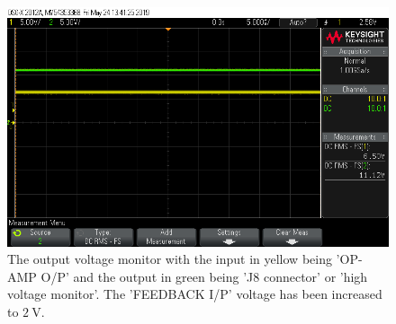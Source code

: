 \begin{figure}[H]
\centering
\includegraphics[width=.9\textwidth]{figures/scope_12.png}
\caption{The output voltage monitor with the input in yellow being 'OP-AMP O/P' and the output in green being 'J8 connector' or 'high voltage monitor'. The 'FEEDBACK I/P' voltage has been increased to $\SI{2}{\volt}$.}
\label{fig:scope_12}
\end{figure}


